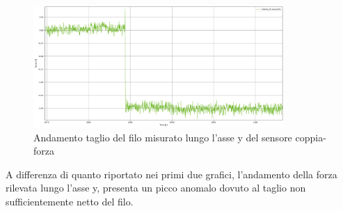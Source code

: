 \begin{figure}[H]
    \centering
    \includegraphics*[width=0.85\textwidth]{images/y_cut.png}
    \caption{Andamento taglio del filo misurato lungo l'asse y del sensore coppia-forza}
    \label{fig:y_cut}
\end{figure}
A differenza di quanto riportato nei primi due grafici, l'andamento della forza rilevata lungo l'asse y, presenta un picco 
anomalo dovuto al taglio non sufficientemente netto del filo.
